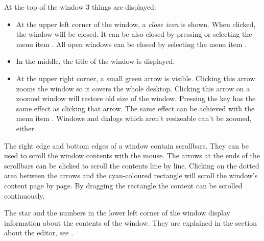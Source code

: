 At the top of the window 3 things are displayed:
\begin{itemize}
\item 
At the upper left corner of the window, a \emph{close icon} is shown. 
When clicked, the window will be closed. It can be also closed by
 pressing  or selecting the menu item . 
All open windows can be closed by selecting the menu item 
.
\item In the middle, the title of the window is displayed.
\item At the upper right corner, a small green arrow is visible.
Clicking this arrow zooms the window so it covers the whole desktop. 
Clicking this arrow on a zoomed window will restore old size of the 
window. Pressing the key  has the same effect as clicking 
that arrow. The same effect can be achieved with the menu item .
Windows and dialogs which aren't resizeable can't be zoomed, either.
\end{itemize}

The right edge and bottom edges of a window contain scrollbars.
They can be used to scroll the window contents with the mouse. 
The arrows at the ends of the scrollbars can be clicked to scroll the 
contents line by line. Clicking on the dotted area between the arrows 
and the cyan-coloured rectangle will scroll the window's content 
page by page. By dragging the rectangle the content can be scrolled 
continuously.

The star and the numbers in the lower left corner of the window
display information about the contents of the window. They
are explained in the section about the editor, see .

%
%
